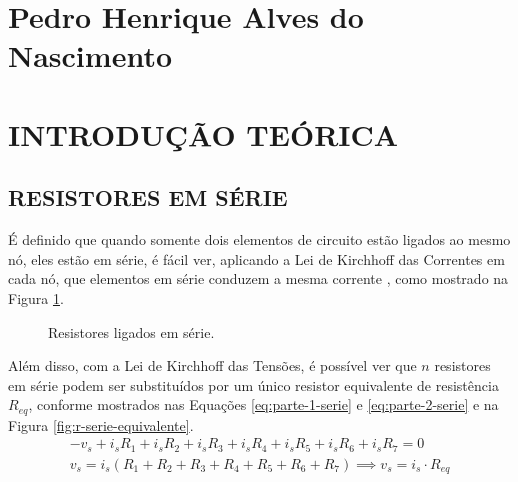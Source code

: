 \documentclass[12pt]{article}
\begin{document}
    
    

    \listoffigures
    \thispagestyle{empty}
    \newpage

    \tableofcontents
    \thispagestyle{empty}
    \newpage

    \section*{Pedro Henrique Alves do Nascimento}
    \section{INTRODUÇÃO TEÓRICA}
    \subsection{RESISTORES EM SÉRIE}
    É definido que quando somente dois elementos de circuito estão ligados ao mesmo nó, eles estão em série, é fácil ver, aplicando a Lei de Kirchhoff das Correntes em cada nó, que elementos em série conduzem a mesma corrente \parencite[][, p. 61]{nilsson}, como mostrado na Figura \ref{fig:r-serie}.

    \begin{figure}[H]
        \centering
        \caption{Resistores ligados em série.}
        \label{fig:r-serie}
    \end{figure}
    
    Além disso, com a Lei de Kirchhoff das Tensões, é possível ver que $n$ resistores em série podem ser substituídos por um único resistor equivalente de resistência $R_{eq}$, conforme mostrados nas Equações \ref{eq:parte-1-serie} e \ref{eq:parte-2-serie} e na Figura \ref{fig:r-serie-equivalente}.
    \begin{gather}
        -v_s+i_sR_1+i_sR_2+i_sR_3+i_sR_4+i_sR_5+i_sR_6+i_sR_7=0 \label{eq:parte-1-serie}\\
        v_s=i_s\left(R_1+R_2+R_3+R_4+R_5+R_6+R_7\right)\implies v_s=i_s\cdot R_{eq} \label{eq:parte-2-serie}
    \end{gather}
\end{document}
